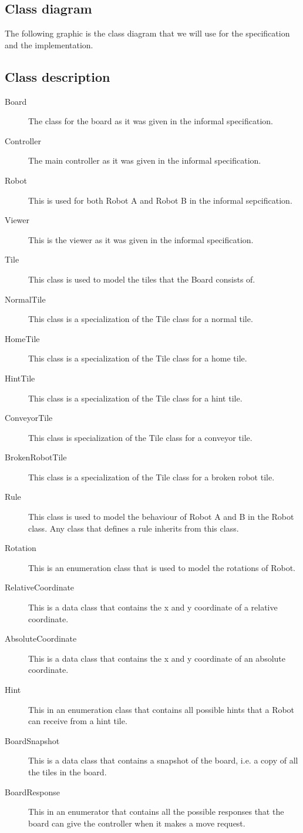 \subsection{Class diagram}
	The following graphic is the class diagram that we will use for the specification and the implementation.
	

\subsection{Class description}
	\begin{description}
		\item[Board] The class for the board as it was given in the informal specification.
		\item[Controller] The main controller as it was given in the informal specification.
		\item[Robot] This is used for both Robot A and Robot B in the informal sepcification.
		\item[Viewer] This is the viewer as it was given in the informal specification.
		\item[Tile] This class is used to model the tiles that the Board consists of.
		\item[NormalTile] This class is a specialization of the Tile class for a normal tile.
		\item[HomeTile] This class is a specialization of the Tile class for a home tile.
		\item[HintTile] This class is a specialization of the Tile class for a hint tile.
		\item[ConveyorTile] This class is specialization of the Tile class for a conveyor tile.
		\item[BrokenRobotTile] This class is a specialization of the Tile class for a broken robot tile.
		\item[Rule] This class is used to model the behaviour of Robot A and B in the Robot class. Any class that defines a rule inherits from this class.
		\item[Rotation] This is an enumeration class that is used to model the rotations of Robot.
		\item[RelativeCoordinate] This is a data class that contains the x and y coordinate of a relative coordinate.
		\item[AbsoluteCoordinate] This is a data class that contains the x and y coordinate of an absolute coordinate.
		\item[Hint] This in an enumeration class that contains all possible hints that a Robot can receive from a hint tile.
		\item[BoardSnapshot] This is a data class that contains a snapshot of the board, i.e. a copy of all the tiles in the board.
		\item[BoardResponse] This in an enumerator that contains all the possible responses that the board can give the controller when it makes a move request.
	\end{description}
